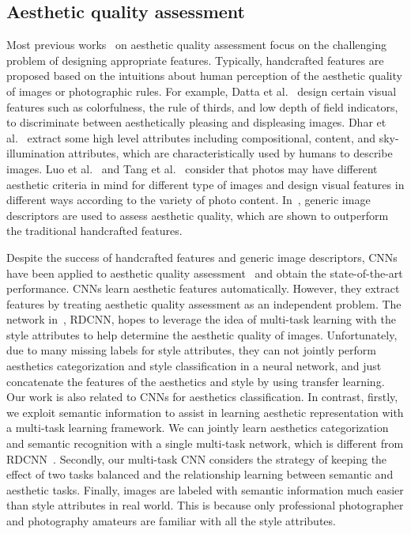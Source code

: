 \documentclass[journal]{IEEEtran}
\begin{document}
\subsection{Aesthetic quality assessment}


Most previous works~\cite{Datta06,Ke06,Dhar11,Mar11,Luo11,Niu12} on aesthetic quality assessment focus on the challenging problem of designing appropriate features. Typically, handcrafted features are proposed based on the intuitions about human perception of the aesthetic quality of images or photographic rules. For example, Datta et al.~\cite{Datta06} design certain visual features such as colorfulness, the rule of thirds, and low depth of field indicators, to discriminate between aesthetically pleasing and displeasing images. Dhar et al.~\cite{Dhar11} extract some high level attributes including compositional, content, and sky-illumination attributes, which are characteristically used by humans to describe images. Luo et al.~\cite{Luo11} and Tang et al.~\cite{Tang13} consider that photos may have different aesthetic criteria in mind for different type of images and design visual features in different ways according to the variety of photo content. In~\cite{Mar11}, generic image descriptors are used to assess aesthetic quality, which are shown to outperform the traditional handcrafted features. 

Despite the success of handcrafted features and generic image descriptors, CNNs have been applied to aesthetic quality assessment~\cite{lu14,kao,lu2015deep,mai2016composition} and obtain the state-of-the-art performance. CNNs learn aesthetic features automatically. However, they extract features by treating aesthetic quality assessment as an independent problem. The network in~\cite{lu14}, RDCNN, hopes to leverage the idea of multi-task learning with the style attributes to help determine the aesthetic quality of images. Unfortunately, due to many missing labels for style attributes, they can not jointly perform aesthetics categorization and style classification in a neural network, and just concatenate the features of the aesthetics and style by using transfer learning. Our work is also related to CNNs for aesthetics classification. In contrast, firstly, we exploit semantic information to assist in learning aesthetic representation with a multi-task learning framework. We can jointly learn aesthetics categorization and semantic recognition with a single multi-task network, which is different from RDCNN~\cite{lu14}. Secondly, our multi-task CNN considers the strategy of keeping the effect of two tasks balanced and the relationship learning between semantic and aesthetic tasks. Finally, images are labeled with semantic information much easier than style attributes in real world. This is because only professional photographer and photography amateurs are familiar with all the style attributes.
\end{document}
